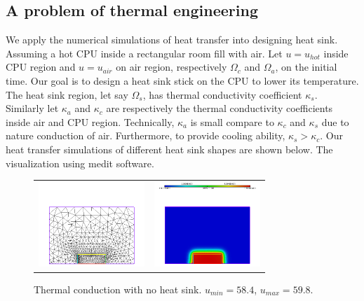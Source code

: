 \subsection{A problem of thermal engineering}
We apply the numerical simulations of heat transfer into designing heat sink. Assuming a hot CPU inside a rectangular room fill with air. Let $u=u_{hot}$ inside CPU region and $u=u_{air}$ on air region, respectively $\Omega_{c}$ and $\Omega_{a}$, on the initial time. Our goal is to design a heat sink stick on the CPU to lower its temperature. \\
The heat sink region, let say $\Omega_{s}$, has thermal conductivity coefficient $\kappa_s$. Similarly let $\kappa_a$ and $\kappa_c$ are respectively the thermal conductivity coefficients inside air and CPU region. Technically, $\kappa_a$ is small compare to $\kappa_c$ and $\kappa_s$ due to nature conduction of air. Furthermore, to provide cooling ability, $\kappa_s>\kappa_c$. Our heat transfer simulations of different heat sink shapes are shown below. The visualization using medit software.\\
\begin{figure}[ht]
	\centering
	\begin{tabular}{c c}
		\includegraphics[width=4cm]{nosinkc} & \includegraphics[width=4cm]{nosinkb}
	\end{tabular}
	\caption{Thermal conduction with no heat sink. $u_{min}=58.4$, $u_{max}=59.8$.}
\end{figure}
